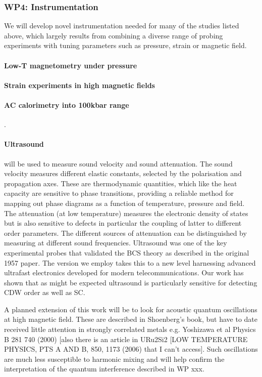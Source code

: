 \subsubsection*{WP4: Instrumentation}
\noindent We will develop novel instrumentation needed for many of the studies listed above, which largely results from combining a diverse range of probing experiments with tuning parameters such as pressure, strain or magnetic field.
\paragraph{Low-T magnetometry under pressure} 
\paragraph{Strain experiments in high magnetic fields} 
\paragraph{AC calorimetry into 100kbar range}  \cite{squire23}.
\paragraph{Ultrasound} will be used to measure sound velocity and sound attenuation. The sound velocity measures different elastic constants, selected by the polarisation and propagation axes. These are thermodynamic quantities, which like the heat capacity are sensitive to phase transitions, providing a reliable method for mapping out phase diagrams as a function of temperature, pressure and field. The attenuation (at low temperature) measures the electronic density of states but is also sensitive to defects in particular the coupling of latter to different order parameters. The different sources of attenuation can be distinguished by measuring at different sound frequencies. Ultrasound was one of the key experimental probes that validated the BCS theory as described in the original 1957 paper. The version we employ takes this to a new level harnessing advanced ultrafast electronics developed for modern telecommunications. Our work has shown that as might be expected ultrasound is particularly sensitive for detecting CDW order as well as SC.

A planned extension of this work will be to look for acoustic quantum oscillations at high magnetic field.  These are described in Shoenberg’s book, but have to date received little attention in strongly correlated metals e.g. Yoshizawa et al Physics B 281 740 (2000) [also there is an article in URu2Si2 [LOW TEMPERATURE PHYSICS, PTS A AND B, 850, 1173 (2006) that I can’t access]. Such oscillations are much less susceptible to harmonic mixing and will help confirm the interpretation of the quantum interference described in WP xxx.

